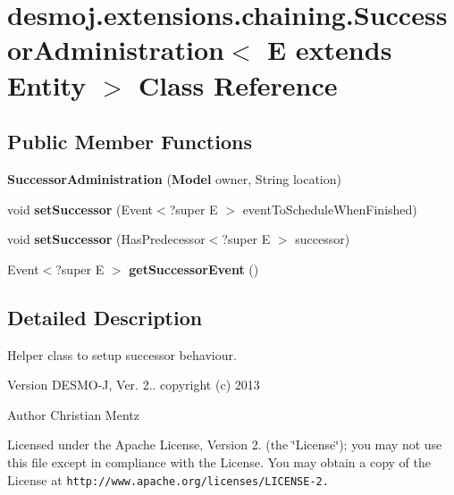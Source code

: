 \section{desmoj.\-extensions.\-chaining.\-Successor\-Administration$<$ E extends Entity $>$ Class Reference}
\label{classdesmoj_1_1extensions_1_1chaining_1_1_successor_administration_3_01_e_01extends_01_entity_01_4}
\subsection*{Public Member Functions}
\begin{DoxyCompactItemize}
\item 
{\bfseries Successor\-Administration} ({\bf Model} owner, String location)\label{classdesmoj_1_1extensions_1_1chaining_1_1_successor_administration_3_01_e_01extends_01_entity_01_4_a050fb4c258a7638abeda2c69d0812a5c}

\item 
void {\bfseries set\-Successor} (Event$<$?super E $>$ event\-To\-Schedule\-When\-Finished)\label{classdesmoj_1_1extensions_1_1chaining_1_1_successor_administration_3_01_e_01extends_01_entity_01_4_aab050036548515d7134510986daa4651}

\item 
void {\bfseries set\-Successor} (Has\-Predecessor$<$?super E $>$ successor)\label{classdesmoj_1_1extensions_1_1chaining_1_1_successor_administration_3_01_e_01extends_01_entity_01_4_ac7312a4632106b46233aea7cc3f04f0e}

\item 
Event$<$?super E $>$ {\bfseries get\-Successor\-Event} ()\label{classdesmoj_1_1extensions_1_1chaining_1_1_successor_administration_3_01_e_01extends_01_entity_01_4_af01246629126ec57cc2d071f5e2d5f04}

\end{DoxyCompactItemize}


\subsection{Detailed Description}
Helper class to setup successor behaviour.

\begin{DoxyVersion}{Version}
D\-E\-S\-M\-O-\/\-J, Ver. 2.. copyright (c) 2013 
\end{DoxyVersion}
\begin{DoxyAuthor}{Author}
Christian Mentz
\end{DoxyAuthor}
Licensed under the Apache License, Version 2. (the \char`\"{}\-License\char`\"{}); you may not use this file except in compliance with the License. You may obtain a copy of the License at {\tt http\-://www.\-apache.\-org/licenses/\-L\-I\-C\-E\-N\-S\-E-\/2.}

